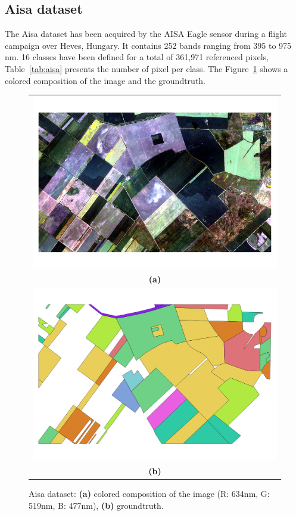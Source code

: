 \documentclass[journal,peerreview,onecolumn]{IEEEtran}
\begin{document}
    \subsection{Aisa dataset}
    \label{sec:aisa-dataset}
    The Aisa dataset has been acquired by the AISA Eagle sensor during
    a  flight campaign  over Heves,  Hungary.  It  contains 252  bands
    ranging from  395 to 975  nm. 16 classes  have been defined  for a
    total of 361,971  referenced pixels, Table~\ref{tab:aisa} presents
    the number of pixel per  class.  The Figure~\ref{fig:aisa} shows a
    colored composition of the image and the groundtruth.

    \begin{figure}[!t]
        \centering
        \begin{tabular}{c}
            \includegraphics[width=0.7\columnwidth]{Fig/aisa.png} \\
            {\bfseries{(a)}} \\
            \includegraphics[width=0.7\columnwidth]{Fig/aisa_gt.png} \\
            {\bfseries{(b)}} \\
        \end{tabular}
        \caption{Aisa dataset: {\bfseries{(a)}} colored composition of the image (R: 634nm, G: 519nm, B: 477nm), {\bfseries{(b)}} groundtruth.\label{fig:aisa}}
    \end{figure}
\end{document}
